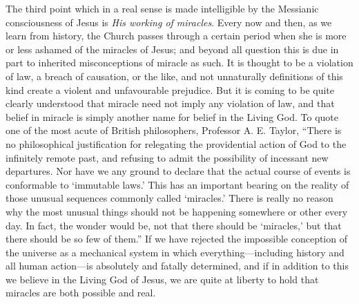 \documentclass[12pt,a5paper,oneside]{book}
\begin{document}
The third point which in a real sense is
made intelligible by the Messianic consciousness
of Jesus is \textit{His working of miracles}. Every now
and then, as we learn from history, the Church
passes through a certain period when she is
more or less ashamed of the miracles of Jesus;
and beyond all question this is due in part to
inherited misconceptions of miracle as such.
It is thought to be a violation of law, a breach
of causation, or the like, and not unnaturally
definitions of this kind create a violent and
unfavourable prejudice. But it is coming to
be quite clearly understood that miracle need
not imply any violation of law, and that belief
in miracle is simply another name for belief
in the Living God. To quote one of the most
acute of British philosophers, Professor A. E.
Taylor, ``There is no philosophical justification
for relegating the providential action of God
to the infinitely remote past, and refusing to
admit the possibility of incessant new departures. 
Nor have we any ground to declare
that the actual course of events is conformable
to `immutable laws.' This has an important
bearing on the reality of those unusual sequences
commonly called `miracles.' There is really
no reason why the most unusual things should
not be happening somewhere or other every
day. In fact, the wonder would be, not that there
should be `miracles,' but that there should be so
few of them.'' If we have rejected the impossible 
conception of the universe as a mechanical
system in which everything---including history
and all human action---is absolutely and fatally
determined, and if in addition to this we
believe in the Living God of Jesus, we are
quite at liberty to hold that miracles are both
possible and real.
\end{document}
